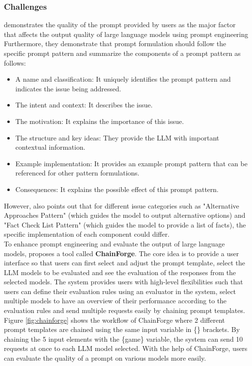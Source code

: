 \documentclass[runningheads]{llncs}
\begin{document}
\subsubsection{Challenges}
\noindent \newline
\cite{White23} demonstrates the quality of the prompt provided by users as the major factor that affects the output quality of large language models using prompt engineering
Furthermore, they demonstrate that prompt formulation should follow the specific prompt pattern and summarize the components of a prompt pattern as follows:
\begin{itemize}
  \item A name and classification: It uniquely identifies the prompt pattern and indicates the issue being addressed.
  \item The intent and context: It describes the issue.
  \item The motivation: It explains the importance of this issue.
  \item The structure and key ideas: They provide the LLM with important contextual information.
  \item Example implementation: It provides an example prompt pattern that can be referenced for other pattern formulations.
  \item Consequences: It explains the possible effect of this prompt pattern.
\end{itemize}
However, \cite{White23} also points out that for different issue categories such as "Alternative Approaches Pattern" (which guides the model to output alternative options) and "Fact Check List Pattern" 
(which guides the model to provide a list of facts), the specific implementation of each component could differ. \\

\noindent \newline
To enhance prompt engineering and evaluate the output of large language models, \cite{Arawjo24} proposes a tool called \textbf{ChainForge}. The core idea is to provide a user interface so that users
can first select and adjust the prompt template, select the LLM models to be evaluated and see the evaluation of the responses from the selected models. The system provides users with high-level
flexibilities such that users can define their evaluation rules using an evaluator in the system, select multiple models to have an overview of their performance according to the evaluation rules
and send multiple requests easily by chaining prompt templates. Figure \ref{fig:chainforge} shows the workflow of ChainForge where 2 different prompt templates are chained using the same input variable in \{\} brackets.
By chaining the 5 input elements with the \{game\} variable, the system can send 10 requests at once to each LLM model selected. With the help of ChainForge, users can evaluate the quality of a prompt on various models more easily. 
\end{document}
